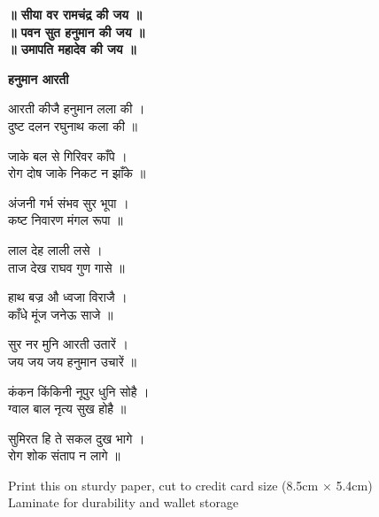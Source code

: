 \vspace{2mm}

\begin{center}
{\small \textbf{॥ सीया वर रामचंद्र की जय ॥}}\\
{\small \textbf{॥ पवन सुत हनुमान की जय ॥}}\\
{\small \textbf{॥ उमापति महादेव की जय ॥}}
\end{center}

\newpage

\begin{center}
{\Large \textbf{हनुमान आरती}}
\end{center}

\vspace{2mm}

आरती कीजै हनुमान लला की ।\\
दुष्ट दलन रघुनाथ कला की ॥

जाके बल से गिरिवर काँपे ।\\
रोग दोष जाके निकट न झाँके ॥

अंजनी गर्भ संभव सुर भूपा ।\\
कष्ट निवारण मंगल रूपा ॥

लाल देह लाली लसे ।\\
ताज देख राघव गुण गासे ॥

हाथ बज्र औ ध्वजा विराजै ।\\
काँधे मूंज जनेऊ साजे ॥

सुर नर मुनि आरती उतारें ।\\
जय जय जय हनुमान उचारें ॥

कंकन किंकिनी नूपुर धुनि सोहै ।\\
ग्वाल बाल नृत्य सुख होहै ॥

सुमिरत हि ते सकल दुख भागे ।\\
रोग शोक संताप न लागे ॥

\vspace{3mm}

\begin{center}
{\footnotesize Print this on sturdy paper, cut to credit card size (8.5cm × 5.4cm)}\\
{\footnotesize Laminate for durability and wallet storage}
\end{center}